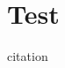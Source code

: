 \documentclass[epjST]{svjour}
\begin{document}
\section{Test}
citation~\cite{wang2014exploring}

{}


\end{document}
